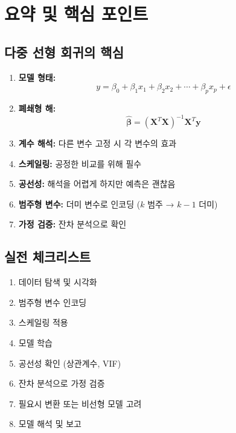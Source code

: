 \documentclass[12pt]{article}
\begin{document}
\section{요약 및 핵심 포인트}

\subsection{다중 선형 회귀의 핵심}

\begin{enumerate}
    \item \textbf{모델 형태:}
    \begin{equation}
    y = \beta_0 + \beta_1 x_1 + \beta_2 x_2 + \cdots + \beta_p x_p + \epsilon
    \end{equation}

    \item \textbf{폐쇄형 해:}
    \begin{equation}
    \hat{\boldsymbol{\beta}} = (\mathbf{X}^T\mathbf{X})^{-1}\mathbf{X}^T\mathbf{y}
    \end{equation}

    \item \textbf{계수 해석:} 다른 변수 고정 시 각 변수의 효과

    \item \textbf{스케일링:} 공정한 비교를 위해 필수

    \item \textbf{공선성:} 해석을 어렵게 하지만 예측은 괜찮음

    \item \textbf{범주형 변수:} 더미 변수로 인코딩 ($k$ 범주 → $k-1$ 더미)

    \item \textbf{가정 검증:} 잔차 분석으로 확인
\end{enumerate}

\subsection{실전 체크리스트}

\begin{enumerate}
    \item 데이터 탐색 및 시각화
    \item 범주형 변수 인코딩
    \item 스케일링 적용
    \item 모델 학습
    \item 공선성 확인 (상관계수, VIF)
    \item 잔차 분석으로 가정 검증
    \item 필요시 변환 또는 비선형 모델 고려
    \item 모델 해석 및 보고
\end{enumerate}
\end{document}
